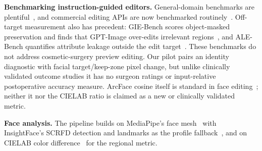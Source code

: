 \textbf{Benchmarking instruction-guided editors.} General-domain benchmarks are
plentiful~\cite{brooks2023instructpix2pix,zhang2023magicbrush,wang2023editbench,
sheynin2024emuedit,ku2024imagenhub,ma2024i2ebench,hui2025hqedit,liu2025step1xedit},
and commercial editing APIs are now benchmarked
routinely~\cite{gptimgeval2025,qian2025giebench}. Off-target measurement also has
precedent: GIE-Bench scores object-masked preservation and finds that GPT-Image
over-edits irrelevant regions~\cite{qian2025giebench}, and ALE-Bench quantifies
attribute leakage outside the edit target~\cite{alebench2024}. These benchmarks
do not address cosmetic-surgery preview editing. Our pilot pairs an identity
diagnostic with facial target/keep-zone pixel change, but unlike clinically
validated outcome studies it has no surgeon ratings or input-relative
postoperative accuracy measure. ArcFace cosine itself is standard in face
editing~\cite{deng2019arcface}; neither it nor the CIELAB ratio is claimed as a
new or clinically validated metric.

\textbf{Face analysis.} The pipeline builds on MediaPipe's face
mesh~\cite{lugaresi2019mediapipe,grishchenko2020attentionmesh} with InsightFace's
SCRFD detection and landmarks as the profile fallback~\cite{guo2022scrfd}, and on
CIELAB color difference~\cite{sharma2005ciede2000} for the regional metric.
